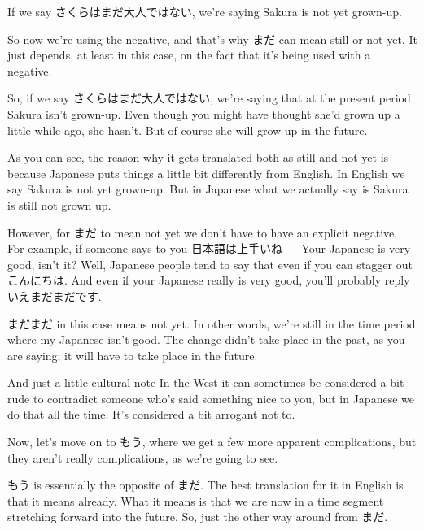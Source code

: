 If we say さくらはまだ大人ではない, we're saying Sakura is not yet grown-up.

{}

So now we're using the negative, and that's why まだ can mean still or not yet. It just depends, at least in this case, on the fact that it's being used with a negative.

So, if we say さくらはまだ大人ではない, we're saying that at the present period Sakura isn't grown-up. Even though you might have thought she'd grown up a little while ago, she hasn't. But of course she will grow up in the future.

As you can see, the reason why it gets translated both as still and not yet is because Japanese puts things a little bit differently from English. In English we say Sakura is not yet grown-up. But in Japanese what we actually say is Sakura is still not grown up.

However, for まだ to mean not yet we don't have to have an explicit negative. For example, if someone says to you 日本語は上手いね --- Your Japanese is very good, isn't it? Well, Japanese people tend to say that even if you can stagger out こんにちは. And even if your Japanese really is very good, you'll probably reply いえまだまだです.

{}

まだまだ in this case means not yet. In other words, we're still in the time period where my Japanese isn't good. The change didn't take place in the past, as you are saying; it will have to take place in the future.

And just a little cultural note In the West it can sometimes be considered a bit rude to contradict someone who's said something nice to you, but in Japanese we do that all the time. It's considered a bit arrogant not to.

\stopsectionlevel

\startsectionlevel[title={もう},reference={もう}]

Now, let's move on to もう, where we get a few more apparent complications, but they aren't really complications, as we're going to see.

{}

もう is essentially the opposite of まだ. The best translation for it in English is that it means already. What it means is that we are now in a time segment stretching forward into the future. So, just the other way around from まだ.

